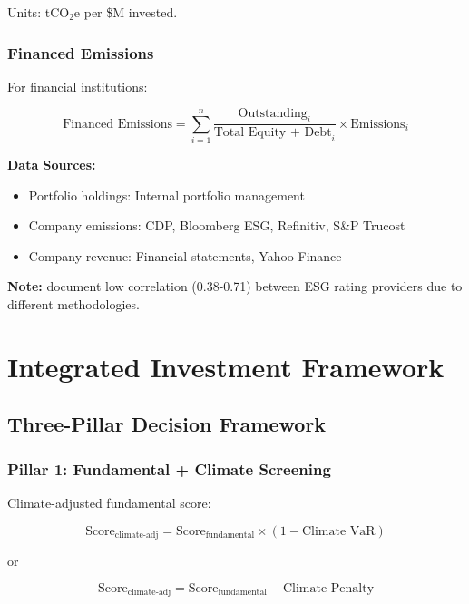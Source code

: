 \documentclass[11pt,a4paper]{article}
\begin{document}
Units: tCO$_2$e per \$M invested.

\subsubsection{Financed Emissions}

For financial institutions:

\begin{equation}
\text{Financed Emissions} = \sum_{i=1}^{n} \frac{\text{Outstanding}_i}{\text{Total Equity + Debt}_i} \times \text{Emissions}_i
\end{equation}

\textbf{Data Sources:}
\begin{itemize}
    \item Portfolio holdings: Internal portfolio management
    \item Company emissions: CDP, Bloomberg ESG, Refinitiv, S\&P Trucost
    \item Company revenue: Financial statements, Yahoo Finance
\end{itemize}

\textbf{Note:} \citet{Berg2022} document low correlation (0.38-0.71) between ESG rating providers due to different methodologies.

\section{Integrated Investment Framework}

\subsection{Three-Pillar Decision Framework}

\subsubsection{Pillar 1: Fundamental + Climate Screening}

Climate-adjusted fundamental score:

\begin{equation}
\text{Score}_{\text{climate-adj}} = \text{Score}_{\text{fundamental}} \times (1 - \text{Climate VaR})
\end{equation}

or

\begin{equation}
\text{Score}_{\text{climate-adj}} = \text{Score}_{\text{fundamental}} - \text{Climate Penalty}
\end{equation}
\end{document}

